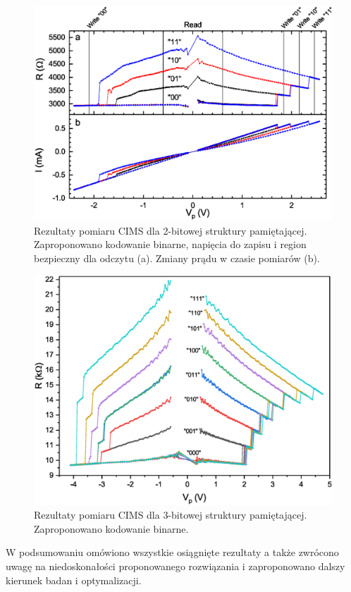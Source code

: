     \begin{figure}[H]
        \centering
        \includegraphics[width=0.5\paperwidth]{img/05/ResultsCIMS2.eps}
        \caption{Rezultaty pomiaru CIMS dla 2-bitowej struktury pamiętającej. Zaproponowano kodowanie binarne, napięcia do zapisu i region bezpieczny dla odczytu (a). Zmiany prądu w czasie pomiarów (b).}
        \label{ExperimentMeasurementCIMS2}
    \end{figure}

    \begin{figure}[H]
        \centering
        \includegraphics[width=0.5\paperwidth]{img/05/ResultsCIMS3.eps}
        \caption{Rezultaty pomiaru CIMS dla 3-bitowej struktury pamiętającej. Zaproponowano kodowanie binarne.}
        \label{ExperimentMeasurementCIMS3}
    \end{figure}

    
    W podsumowaniu omówiono wszystkie osiągnięte rezultaty a także zwrócono uwagę na niedoskonałości proponowanego rozwiązania i zaproponowano dalszy kierunek badan i optymalizacji.
